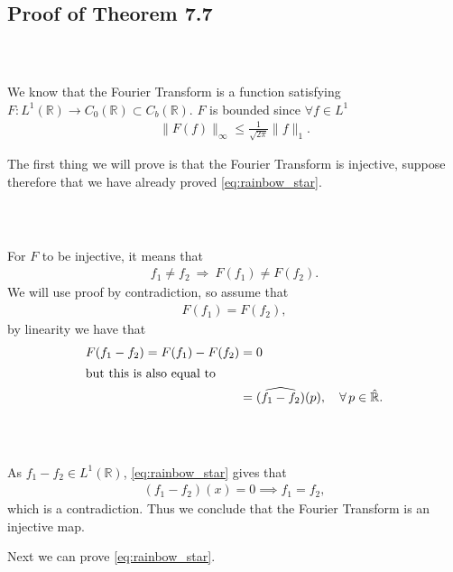 \documentclass{beamer}
\numberwithin{equation}{section}
\begin{document}
\subsection{Proof of Theorem 7.7}

\begin{frame}\frametitle{{\normalsize \secname} \\ {\large \subsecname}}
    We know that the Fourier Transform is a function satisfying $F: L^1 (\mathbb{R}) \rightarrow C_0(\mathbb{R}) \subset C_b (\mathbb{R})$.
    $F$ is bounded since $\forall f \in L^1$
    \begin{align}
        \| F(f) \|_\infty \leq \frac{1}{\sqrt{2 \pi}}\|f\|_1.
    \end{align}
    \vspace{1em}

    The first thing we will prove is that the Fourier Transform is injective, suppose therefore that we have already proved \eqref{eq:rainbow_star}.
\end{frame}

\begin{frame}\frametitle{{\normalsize \secname} \\ {\large \subsecname}}
    For $F$ to be injective, it means that
    \begin{align}
        f_1 \neq f_2 \ \Rightarrow \ F(f_1) \neq F(f_2).
    \end{align}
    We will use proof by contradiction, so assume that
    \begin{align}
        F(f_1) = F(f_2),
    \end{align}
    by linearity we have that
    \begin{align}
        F(f_1 - f_2) = F(f_1) - F(f_2) &= 0 \\
        \intertext{but this is also equal to}
        &= \widehat{(f_1 - f_2)}(p), \quad \forall \, p \in \hat{\mathbb{R}}.
    \end{align}
\end{frame}

\begin{frame}\frametitle{{\normalsize \secname} \\ {\large \subsecname}}
    As $f_1 - f_2 \in L^1(\mathbb{R})$, \eqref{eq:rainbow_star} gives that
    \begin{align}
        (f_1 - f_2)(x) = 0 \implies f_1 = f_2,
    \end{align}
    which is a contradiction.
    Thus we conclude that the Fourier Transform is an injective map.
    \vspace{1em}

    Next we can prove \eqref{eq:rainbow_star}.
\end{frame}
\end{document}
